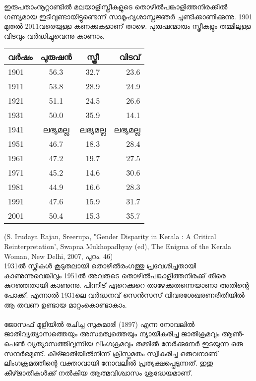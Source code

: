 \label{ch3box2} %
\begin{tcolorbox}[%
 breakable, %
  arc=0mm, 
  left=1pt, right = 1pt, 
  boxrule=0mm,
  colback = {blue!10}, %
] 
ഇരുപതാംനൂറ്റാണ്ടിൽ മലയാളിസ്ത്രീകളുടെ തൊഴിൽപങ്കാളിത്തനിരക്കിൽ ഗണ്യമായ ഇടിവുണ്ടായിട്ടുണ്ടെന്ന് സാമൂഹ്യശാസ്ത്രജ്ഞർ ചൂണ്ടിക്കാണിക്കുന്നു. 1901 മുതൽ 2011വരെയുള്ള കണക്കുകളാണ് താഴെ. പുരുഷന്മാരും സ്ത്രീകളും തമ്മിലുള്ള വിടവും വർദ്ധിച്ചുവെന്നു കാണാം. 

\begin{tabular}{ l c c r }
വർഷം &	പുരുഷൻ	& സ്ത്രീ &	വിടവ് \\
\hline
1901 &	56.3	&  32.7&	23.6\\
1911	& 53.8	& 28.9	& 24.9\\
1921&	51.1&	24.5&	26.6\\
1931	&50.0&	35.9&	14.1\\
1941&	ലഭ്യമല്ല&	ലഭ്യമല്ല	&ലഭ്യമല്ല\\
1951&	46.7&	18.3	&28.4\\
1961	&47.2	&19.7&	27.5\\
1971&	45.2	&14.6&	30.6\\
1981&	44.9&	16.6&	28.3\\
1991&	47.6&	15.9&	31.7\\
2001&	50.4	&15.3&	35.7\\
\end{tabular}

(S. Irudaya Rajan, Sreerupa, "Gender Disparity in Kerala : A Critical Reinterpretation', Swapna Mukhopadhyay (ed), The Enigma of the Kerala Woman, New Delhi, 2007, പുറം. 46)
\\
1931ൽ സ്ത്രീകൾ കൂടുതലായി തൊഴിൽരംഗത്തു പ്രവേശിച്ചതായി കാണുന്നുവെങ്കിലും 1951ൽ അവരുടെ തൊഴിൽപങ്കാളിത്തനിരക്ക് തീരെ കുറഞ്ഞതായി കാണുന്നു. പിന്നീട് ഏറെക്കുറെ താഴേക്കുതന്നെയാണാ അതിന്റെ പോക്ക്. എന്നാൽ 1931ലെ വർദ്ധനവ് സെൻസസ് വിവരശേഖരണരീതിയിൽ ആ തവണ ഉണ്ടായ മാറ്റംകൊണ്ടാകാം.
\end{tcolorbox}

\paragraph{}ജോസഫ് മൂളിയിൽ രചിച്ച സുകുമാരി (1897) എന്ന നോവലിൽ ജാതിവ്യത്യാസത്തെയും അസമത്വത്തെയും ന്യായീകരിച്ച ജാതിക്രമവും ആൺ-പെൺ വ്യത്യാസത്തിലൂന്നിയ ലിംഗക്രമവും തമ്മിൽ നേർക്കുനേർ ഇടയുന്ന ഒരു സന്ദർഭമുണ്ട്. കീഴ്ജാതിയിൽനിന്ന് ക്രിസ്തുമതം സ്വീകരിച്ച ഒരുവനാണ് ലിംഗക്രമത്തിന്റെ വക്താവായി നോവലിൽ പ്രത്യക്ഷപ്പെടുന്നത്. ഇതു കീഴ്ജാതികൾക്ക് നൽകിയ ആത്മവിശ്വാസം ശ്രദ്ധേയമാണ്.
